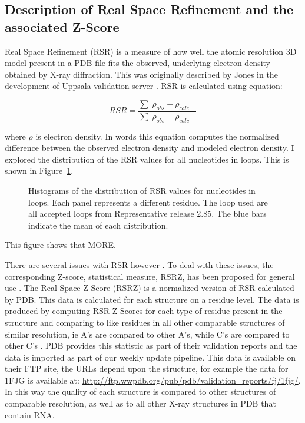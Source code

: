 \subsection{Description of Real Space Refinement and the associated Z-Score}

Real Space Refinement (RSR) is a measure of how well the atomic resolution 3D
model present in a PDB file fits the observed, underlying electron density
obtained by X-ray diffraction. This was originally described by Jones \etal in
the development of Uppsala validation server \cite{Kleywegt2004a}. RSR is
calculated using equation:

\begin{equation}
  RSR = \frac{\sum \mid \rho_{obs} - \rho_{calc} \mid}
             {\sum \mid \rho_{obs} + \rho_{calc} \mid}
\end{equation}

where $\rho$ is electron density. In words this equation computes the normalized
difference between the observed electron density and modeled electron density. I
explored the distribution of the RSR values for all nucleotides in loops. This
is shown in Figure~\ref{fig:rsr-nt-distribution}.

\begin{figure}[ht]
  \caption{Histograms of the distribution of RSR values for nucleotides in
    loops. Each panel represents a different residue. The loop used are all
    accepted loops from Representative release 2.85. The blue bars indicate the mean
  of each distribution.}
  \label{fig:rsr-nt-distribution}
\end{figure}

This figure shows that MORE.

There are several issues with RSR however \cite{Tickle2012}. To deal with these
issues, the corresponding Z-score, statistical measure, RSRZ, has been proposed
for general use \cite{Gore2012}. The Real Space Z-Score (RSRZ) is a normalized
version of RSR calculated by PDB. This data is calculated for each structure on
a residue level. The data is produced by computing RSR Z-Scores for each type of
residue present in the structure and comparing to like residues in all other
comparable structures of similar resolution, ie A's are compared to other A's,
while C's are compared to other C's \cite{Gore2012, Kleywegt2004a}. PDB provides
this statistic as part of their validation reports and the data is imported as
part of our weekly update pipeline. This data is available on their FTP site,
the URLs depend upon the structure, for example the data for 1FJG is available
at: \url{http://ftp.wwpdb.org/pub/pdb/validation\_reports/fj/1fjg/}. In this way
the quality of each structure is compared to other structures of comparable
resolution, as well as to all other X-ray structures in PDB that contain RNA.

